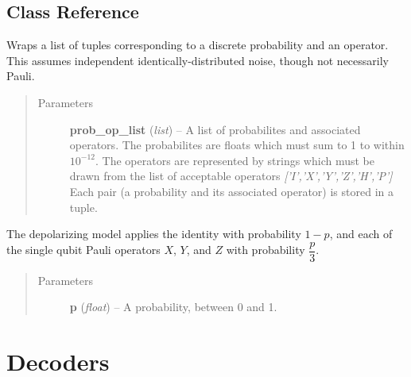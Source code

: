 \documentclass[letterpaper,10pt,english]{sphinxmanual}
\begin{document}
\section{Class Reference}
\label{error:class-reference}

\begin{fulllineitems}
\label{error:py_qcode.ErrorModel}
Wraps a list of tuples corresponding to a discrete probability and an operator. This assumes independent identically-distributed noise, though not necessarily Pauli.
\begin{quote}\begin{description}
\item[{Parameters}] \leavevmode
\textbf{prob\_op\_list} (\emph{list}) -- A list of probabilites and associated operators. The probabilites are floats which must sum to 1 to within $10^{-12}$. The operators are represented by strings which must be drawn from the list of acceptable operators \emph{{[}'I','X','Y','Z','H','P'{]}} Each pair (a probability and its associated operator) is stored in a tuple.

\end{description}\end{quote}

\end{fulllineitems}


\begin{fulllineitems}
\label{error:py_qcode.DepolarizingModel}
The depolarizing model applies the identity with probability $1-p$, and each of the single qubit Pauli operators $X$, $Y$, and $Z$ with probability $\dfrac{p}{3}$.
\begin{quote}\begin{description}
\item[{Parameters}] \leavevmode
\textbf{p} (\emph{float}) -- A probability, between 0 and 1.

\end{description}\end{quote}

\end{fulllineitems}



\chapter{Decoders}
\label{decoder:decoders}\label{decoder::doc}
\end{document}
